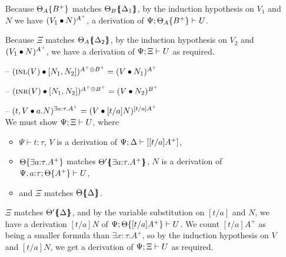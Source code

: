 \begin{itemize}

  Because ${\Theta_A}\{{B^+}\}$ matches ${\Theta_B}\mbox{$\{\hspace{-4pt}\{$}{\Delta_1}\mbox{$\}\hspace{-4pt}\}$}$,
  by the induction hypothesis on $V_1$ and $N$ we have
  $({V_1} \bullet {N})^{A^+}$, a derivation of 
  ${\Psi};{{\Theta_A}\{{B^+}\}} \vdash {U}$.

  Because $\Xi$ matches ${\Theta_A}\mbox{$\{\hspace{-4pt}\{$}{\Delta_2}\mbox{$\}\hspace{-4pt}\}$}$, by the induction
  hypothesis on $V_2$ and $({V_1} \bullet {N})^{A^+}$, we have a derivation
  of ${\Psi};{\Xi} \vdash {U}$ as required. \smallskip

\item[--] $({\textsc{inl}({V})} \bullet {[{N_1},{N_2}]})^{A^+ \oplus B^+} 
           = ({V} \bullet {N_1})^{A^+}$

\item[--] $({\textsc{inr}({V})} \bullet {[{N_1},{N_2}]})^{A^+ \oplus B^+} 
           = ({V} \bullet {N_2})^{B^+}$

\item[--] $({{t},{V}} \bullet {{a}.{N}})^{\exists a{:}\tau.A^+}
           = ({V} \bullet {[t/a]N})^{[t/a]A^+}$ \smallskip\\
  We must show ${\Psi};{\Xi} \vdash {U}$, where
  \begin{itemize}
  \item $\Psi \vdash t : \tau$, $V$ is a derivation of 
     ${\Psi};{\Delta} \vdash {[[t/a]A^+]}$,
  \item ${\Theta}\{{\exists a{:}\tau. A^+}\}$ 
     matches ${\Theta'}\mbox{$\{\hspace{-4pt}\{$}{\exists a{:}\tau. A^+}\mbox{$\}\hspace{-4pt}\}$}$, 
     $N$ is a derivation of 
     ${\Psi, a{:}\tau};{{\Theta}\{{A^+}\}} \vdash {U}$,
  \item and $\Xi$ matches ${\Theta}\mbox{$\{\hspace{-4pt}\{$}{\Delta}\mbox{$\}\hspace{-4pt}\}$}$.
  \end{itemize}
  $\Xi$ matches ${\Theta'}\mbox{$\{\hspace{-4pt}\{$}{\Delta}\mbox{$\}\hspace{-4pt}\}$}$, and by the variable
  substitution on $[t/a]$ and $N$, we have a derivation $[t/a]N$ of
  ${\Psi};{{\Theta}\{{[t/a]A^+}\}} \vdash {U}$.  We count $[t/a]A^+$ as
  being a smaller formula than $\exists x{:}\tau.A^+$, so by the
  induction hypothesis on $V$ and $[t/a]N$, we get a derivation of
  ${\Psi};{\Xi} \vdash {U}$ as required. \smallskip


\end{itemize}
